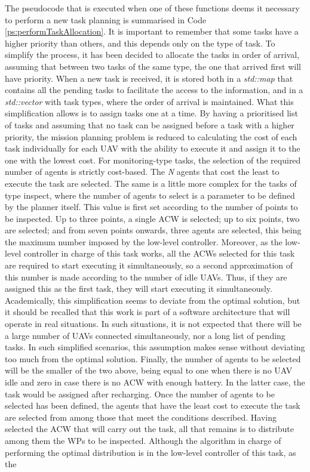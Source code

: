 \documentclass[fontsize=11pt, English=false, Español=true, Myfinal=true, twoside, numbers=noenddot]{scrbook}
\begin{document}
{%
The pseudocode that is executed when one of these functions deems it necessary to perform a new task planning is summarised in Code \ref{ps:performTaskAllocation}. It is important to remember that some tasks have a higher priority than others, and this depends only on the type of task. To simplify the process, it has been decided to allocate the tasks in order of arrival, assuming that between two tasks of the same type, the one that arrived first will have priority. When a new task is received, it is stored both in a \emph{std::map} that contains all the pending tasks to facilitate the access to the information, and in a \emph{std::vector} with task types, where the order of arrival is maintained. What this simplification allows is to assign tasks one at a time. By having a prioritised list of tasks and assuming that no task can be assigned before a task with a higher priority, the mission planning problem is reduced to calculating the cost of each task individually for each \gls{UAV} with the ability to execute it and assign it to the one with the lowest cost. For monitoring-type tasks, the selection of the required number of agents is strictly cost-based. The \emph{N} agents that cost the least to execute the task are selected. The same is a little more complex for the tasks of type inspect, where the number of agents to select is a parameter to be defined by the planner itself. This value is first set according to the number of points to be inspected. Up to three points, a single \gls{ACW} is selected; up to six points, two are selected; and from seven points onwards, three agents are selected, this being the maximum number imposed by the low-level controller. Moreover, as the low-level controller in charge of this task works, all the \glspl{ACW} selected for this task are required to start executing it simultaneously, so a second approximation of this number is made according to the number of idle \glspl{UAV}. Thus, if they are assigned this as the first task, they will start executing it simultaneously. Academically, this simplification seems to deviate from the optimal solution, but it should be recalled that this work is part of a software architecture that will operate in real situations. In such situations, it is not expected that there will be a large number of \glspl{UAV} connected simultaneously, nor a long list of pending tasks. In such simplified scenarios, this assumption makes sense without deviating too much from the optimal solution. Finally, the number of agents to be selected will be the smaller of the two above, being equal to one when there is no \gls{UAV} idle and zero in case there is no \gls{ACW} with enough battery. In the latter case, the task would be assigned after recharging. Once the number of agents to be selected has been defined, the agents that have the least cost to execute the task are selected from among those that meet the conditions described. Having selected the \gls{ACW} that will carry out the task, all that remains is to distribute among them the \glspl{WP} to be inspected. Although the algorithm in charge of performing the optimal distribution is in the low-level controller of this task, as the }
\end{document}
